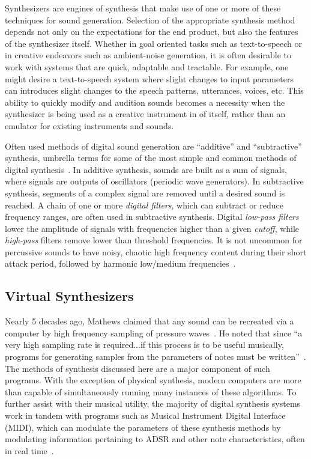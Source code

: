 \documentclass[\main/thesis.tex]{subfiles}
\begin{document}
Synthesizers are engines of synthesis that make use of one or more of these techniques for sound generation. Selection of the appropriate synthesis method depends not only on the expectations for the end product, but also the features of the synthesizer itself. Whether in goal oriented tasks such as text-to-speech or in creative endeavors such as ambient-noise generation, it is often desirable to work with systems that are quick, adaptable and tractable. For example, one might desire a text-to-speech system where slight changes to input parameters can introduces slight changes to the speech patterns, utterances, voices, etc. This ability to quickly modify and audition sounds becomes a necessity when the synthesizer is being used as a creative instrument in of itself, rather than an emulator for existing instruments and sounds. 

Often used methods of digital sound generation are \enquote{additive} and \enquote{subtractive} synthesis, umbrella terms for some of the most simple and common methods of digital synthesis~\cite{mitchell2009basicsynthChap1}. 
In additive synthesis, sounds are built as a sum of signals, where signals are outputs of oscillators (periodic wave generators).  In subtractive synthesis, segments of a complex signal are removed until a desired sound is reached. A chain of one or more \textit{digital filters}, which can subtract or reduce frequency ranges, are often used in subtractive synthesis. Digital \textit{low-pass filters} lower the amplitude of signals with frequencies higher than a given \textit{cutoff}, while \textit{high-pass} filters remove lower than threshold frequencies. It is not uncommon for percussive sounds to have noisy, chaotic high frequency content during their short attack period, followed by harmonic low/medium frequencies~\cite{lakatos2000common}.


\subsection{Virtual Synthesizers}
Nearly 5 decades ago, Mathews claimed that any sound can be recreated via a computer by high frequency sampling of pressure waves~\cite{mathews1963digital}. He noted that since \enquote{a very high sampling rate is required...if this process is to be useful musically, programs for generating samples from the parameters of notes must be written}~\cite{mathews1963digital}. The methods of synthesis discussed here are a major component of such programs. With the exception of physical synthesis, modern computers are more than capable of simultaneously running many instances of these algorithms. To further assist with their musical utility, the majority of digital synthesis systems work in tandem with programs such as Musical Instrument Digital Interface (MIDI), which can modulate the parameters of these synthesis methods by modulating information pertaining to ADSR and other note characteristics, often in real time~\cite{moog1986midi}.  
\end{document}
